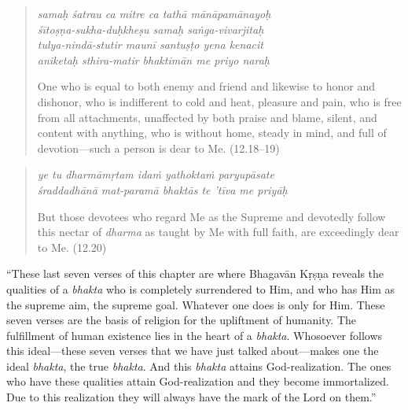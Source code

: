 \documentclass[12pt, twoside, openright]{memoir}
\begin{document}
\par
\begin{verse}
\textit{samaḥ śatrau ca mitre ca tathā mānāpamānayoḥ} \\
\textit{śītoṣṇa-sukha-duḥkheṣu samaḥ saṅga-vivarjitaḥ} \\
\textit{tulya-nindā-stutir maunī santuṣṭo yena kenacit} \\
\textit{aniketaḥ sthira-matir bhaktimān me priyo naraḥ}

\noindent One who is equal to both enemy and friend and likewise to honor and dishonor, who is indifferent to cold and heat, pleasure and pain, who is free from all attachments, unaffected by both praise and blame, silent, and content with anything, who is without home, steady in mind, and full of devotion---such a person is dear to Me. (12.18–19)
\end{verse}
\par



\par
\begin{verse}
\textit{ye tu dharmāmṛtam idaṁ yathoktaṁ paryupāsate} \\
\textit{śraddadhānā mat-paramā bhaktās te ’tīva me priyāḥ}

\noindent But those devotees who regard Me as the Supreme and devotedly follow this nectar of \textit{dharma} as taught by Me with full faith, are exceedingly dear to Me. (12.20)
\end{verse}
\par


\enquote{These last seven verses of this chapter are where Bhagavān Kṛṣṇa reveals the qualities of a \textit{bhakta} who is completely surrendered to Him, and who has Him as the supreme aim, the supreme goal. Whatever one does is only for Him. These seven verses are the basis of religion for the upliftment of humanity. The fulfillment of human existence lies in the heart of a \textit{bhakta}. Whosoever follows this ideal---these seven verses that we have just talked about---makes one the ideal \textit{bhakta}, the true \textit{bhakta}. And this \textit{bhakta} attains God-realization. The ones who have these qualities attain God-realization and they become immortalized. Due to this realization they will always have the mark of the Lord on them.}
\end{document}
